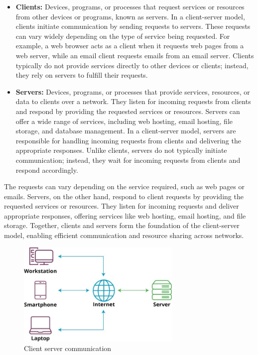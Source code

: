 \begin{itemize}
    \item \textbf{Clients:} Devices, programs, or processes that request services or resources from other devices or programs, known as servers. In a client-server model, clients initiate communication by sending requests to servers. These requests can vary widely depending on the type of service being requested. For example, a web browser acts as a client when it requests web pages from a web server, while an email client requests emails from an email server. Clients typically do not provide services directly to other devices or clients; instead, they rely on servers to fulfill their requests.
    
    \item \textbf{Servers:} Devices, programs, or processes that provide services, resources, or data to clients over a network. They listen for incoming requests from clients and respond by providing the requested services or resources. Servers can offer a wide range of services, including web hosting, email hosting, file storage, and database management. In a client-server model, servers are responsible for handling incoming requests from clients and delivering the appropriate responses. Unlike clients, servers do not typically initiate communication; instead, they wait for incoming requests from clients and respond accordingly.
\end{itemize}

The requests can vary depending on the service required, such as web pages or emails. Servers, on the other hand, respond to client requests by providing the requested services or resources. They listen for incoming requests and deliver appropriate responses, offering services like web hosting, email hosting, and file storage. Together, clients and servers form the foundation of the client-server model, enabling efficient communication and resource sharing across networks.\\

\begin{figure}[htbp]
    \centering
    \includegraphics[width=0.7\textwidth]{images/client-server.jpg}
    \caption{Client server communication}
    \label{fig:example-np-2}
\end{figure}

